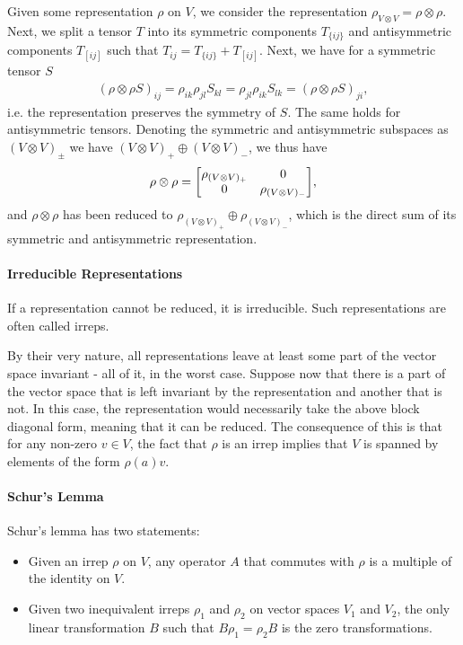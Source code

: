 Given some representation $\rho$ on $V$, we consider the representation $\rho_{V\otimes V} = \rho\otimes\rho$. Next, we split a tensor $T$ into its symmetric components $T_{\{ij\}}$ and antisymmetric components $T_[ij]$ such that $T_{ij} = T_{\{ij\}} + T_[ij]$. Next, we have for a symmetric tensor $S$
\begin{align*}
	(\rho\otimes\rho S)_{ij} = \rho_{ik}\rho_{jl}S_{kl} = \rho_{jl}\rho_{ik}S_{lk} = (\rho\otimes\rho S)_{ji},
\end{align*}
i.e. the representation preserves the symmetry of $S$. The same holds for antisymmetric tensors. Denoting the symmetric and antisymmetric subspaces as $(V\otimes V)_{\pm}$ we have $(V\otimes V)_{+}\oplus(V\otimes V)_{-}$, we thus have
\begin{align*}
	\rho\otimes\rho =
	\mqty[
		\rho_{(V\otimes V)_{+}} & 0 \\
		0                       & \rho_{(V\otimes V)_{-}}
	],
\end{align*}
and $\rho\otimes\rho$ has been reduced to $\rho_{(V\otimes V)_{+}}\oplus\rho_{(V\otimes V)_{-}}$, which is the direct sum of its symmetric and antisymmetric representation.

\paragraph{Irreducible Representations}
If a representation cannot be reduced, it is irreducible. Such representations are often called irreps.

By their very nature, all representations leave at least some part of the vector space invariant - all of it, in the worst case. Suppose now that there is a part of the vector space that is left invariant by the representation and another that is not. In this case, the representation would necessarily take the above block diagonal form, meaning that it can be reduced. The consequence of this is that for any non-zero $v\in V$, the fact that $\rho$ is an irrep implies that $V$ is spanned by elements of the form $\rho(a)v$.

\paragraph{Schur's Lemma}
Schur's lemma has two statements:
\begin{itemize}
	\item Given an irrep $\rho$ on $V$, any operator $A$ that commutes with $\rho$ is a multiple of the identity on $V$.
	\item Given two inequivalent irreps $\rho_{1}$ and $\rho_{2}$ on vector spaces $V_{1}$ and $V_{2}$, the only linear transformation $B$ such that $B\rho_{1} = \rho_{2}B$ is the zero transformations.
\end{itemize}

